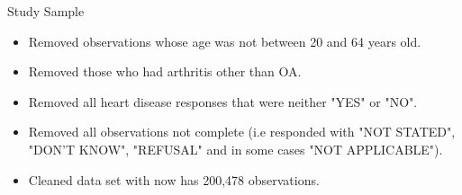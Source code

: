 \begin{frame}{Study Sample}
\begin{itemize}
    \item Removed observations whose age was not between 20 and 64 years old.
    \item Removed those who had arthritis other than OA.
    \item Removed all heart disease responses that were neither "YES" or "NO".
    \item Removed all observations not complete (i.e responded with "NOT STATED", "DON'T KNOW", "REFUSAL" and in some cases "NOT APPLICABLE"). 
    \item Cleaned data set with now has 200,478 observations.
\end{itemize}
\end{frame}